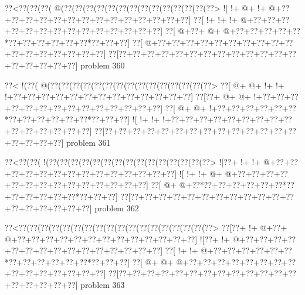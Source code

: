 \vbox{\vbox{\goo
\0??<\0??(\0??(\0??(\- @(\0??(\0??(\0??(\0??(\0??(\0??(\0??(\0??(\0??(\0??(\0??(\0??(\0??(\0??>
\- ![\- !+\- @+\- !+\- @+\0??+\0??+\0??+\0??+\0??+\0??+\0??+\0??+\0??+\0??+\0??+\0??+\0??+\0??]
\0??[\- !+\- !+\- !+\- @+\0??+\0??+\0??+\0??+\0??+\0??+\0??+\0??+\0??+\0??+\0??+\0??+\0??+\0??]
\0??[\- @+\0??+\- @+\- @+\0??+\0??+\0??+\0??+\0??*\0??+\0??+\0??+\0??+\0??+\0??*\0??+\0??+\0??]
\0??[\- @+\0??+\0??+\0??+\0??+\0??+\0??+\0??+\0??+\0??+\0??+\0??+\0??+\0??+\0??+\0??+\0??+\0??]
\0??[\0??+\0??+\0??+\0??+\0??+\0??+\0??+\0??+\0??+\0??+\0??+\0??+\0??+\0??+\0??+\0??+\0??+\0??]
}
\hfil problem 360\hfil\break
}



\vbox{\vbox{\goo
\0??<\- !(\0??(\- @(\0??(\0??(\0??(\0??(\0??(\0??(\0??(\0??(\0??(\0??(\0??(\0??(\0??(\0??(\0??>
\0??[\- @+\- @+\- !+\- !+\- !+\0??+\0??+\0??+\0??+\0??+\0??+\0??+\0??+\0??+\0??+\0??+\0??+\0??]
\0??[\0??+\- @+\- @+\- !+\0??+\0??+\0??+\0??+\0??+\0??+\0??+\0??+\0??+\0??+\0??+\0??+\0??+\0??]
\0??[\- @+\- @+\- !+\0??+\0??+\0??+\0??+\0??+\0??*\0??+\0??+\0??+\0??+\0??+\0??*\0??+\0??+\0??]
\- ![\- !+\- !+\- !+\0??+\0??+\0??+\0??+\0??+\0??+\0??+\0??+\0??+\0??+\0??+\0??+\0??+\0??+\0??]
\0??[\0??+\0??+\0??+\0??+\0??+\0??+\0??+\0??+\0??+\0??+\0??+\0??+\0??+\0??+\0??+\0??+\0??+\0??]
}
\hfil problem 361\hfil\break
}



\vbox{\vbox{\goo
\0??<\0??(\0??(\- !(\0??(\0??(\0??(\0??(\0??(\0??(\0??(\0??(\0??(\0??(\0??(\0??(\0??(\0??(\0??>
\- ![\0??+\- !+\- !+\- @+\0??+\0??+\0??+\0??+\0??+\0??+\0??+\0??+\0??+\0??+\0??+\0??+\0??+\0??]
\- ![\- !+\- !+\- @+\- @+\0??+\0??+\0??+\0??+\0??+\0??+\0??+\0??+\0??+\0??+\0??+\0??+\0??+\0??]
\0??[\- @+\- @+\0??*\0??+\0??+\0??+\0??+\0??+\0??*\0??+\0??+\0??+\0??+\0??+\0??*\0??+\0??+\0??]
\0??[\0??+\0??+\0??+\0??+\0??+\0??+\0??+\0??+\0??+\0??+\0??+\0??+\0??+\0??+\0??+\0??+\0??+\0??]
}
\hfil problem 362\hfil\break
}



\vbox{\vbox{\goo
\0??<\0??(\0??(\0??(\0??(\0??(\0??(\0??(\0??(\0??(\0??(\0??(\0??(\0??(\0??(\0??(\0??(\0??(\0??>
\0??[\0??+\- !+\- @+\0??+\- @+\0??+\0??+\0??+\0??+\0??+\0??+\0??+\0??+\0??+\0??+\0??+\0??+\0??]
\- ![\0??+\- !+\- @+\0??+\0??+\0??+\0??+\0??+\0??+\0??+\0??+\0??+\0??+\0??+\0??+\0??+\0??+\0??]
\0??[\- !+\- !+\- @+\0??+\0??+\0??+\0??+\0??+\0??*\0??+\0??+\0??+\0??+\0??+\0??*\0??+\0??+\0??]
\0??[\- @+\- @+\- @+\0??+\0??+\0??+\0??+\0??+\0??+\0??+\0??+\0??+\0??+\0??+\0??+\0??+\0??+\0??]
\0??[\0??+\0??+\0??+\0??+\0??+\0??+\0??+\0??+\0??+\0??+\0??+\0??+\0??+\0??+\0??+\0??+\0??+\0??]
}
\hfil problem 363\hfil\break
}



